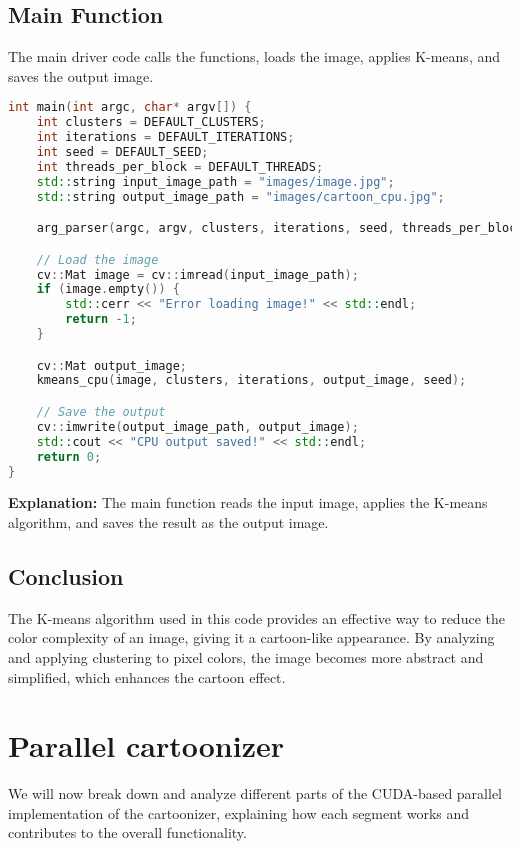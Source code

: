 \subsection{Main Function}
The main driver code calls the functions, loads the image, applies K-means, and saves the output image.

\begin{lstlisting}[language=C++]
int main(int argc, char* argv[]) {
    int clusters = DEFAULT_CLUSTERS;
    int iterations = DEFAULT_ITERATIONS;
    int seed = DEFAULT_SEED;
    int threads_per_block = DEFAULT_THREADS;
    std::string input_image_path = "images/image.jpg";
    std::string output_image_path = "images/cartoon_cpu.jpg";

    arg_parser(argc, argv, clusters, iterations, seed, threads_per_block, input_image_path, output_image_path);

    // Load the image
    cv::Mat image = cv::imread(input_image_path);
    if (image.empty()) {
        std::cerr << "Error loading image!" << std::endl;
        return -1;
    }

    cv::Mat output_image;
    kmeans_cpu(image, clusters, iterations, output_image, seed);

    // Save the output
    cv::imwrite(output_image_path, output_image);
    std::cout << "CPU output saved!" << std::endl;
    return 0;
}
\end{lstlisting}

\textbf{Explanation:}
The main function reads the input image, applies the K-means algorithm, and saves the result as the output image.

\subsection{Conclusion}
The K-means algorithm used in this code provides an effective way to reduce the color complexity of an image, giving it a cartoon-like appearance. By analyzing and applying clustering to pixel colors, the image becomes more abstract and simplified, which enhances the cartoon effect.



\section{Parallel cartoonizer}
We will now break down and analyze different parts of the CUDA-based parallel implementation of the cartoonizer, explaining how each segment works and contributes to the overall functionality.

